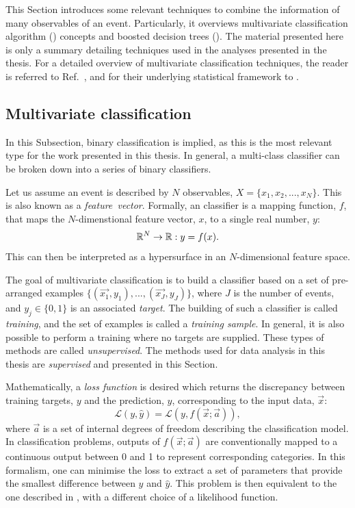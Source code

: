 This Section introduces some relevant techniques to combine the information of many observables of an event. 
Particularly, it overviews multivariate classification algorithm (\MVA) concepts and boosted decision trees (). 
The material presented here is only a summary detailing techniques used in the analyses presented in the thesis.
For a detailed overview of multivariate classification techniques, the reader is referred to Ref.~\cite{Behnke:2013pga}, and for their underlying statistical framework to \cite{Hastie_Tibshirani_Friedman_2001,bishop_2016}.

\subsection{Multivariate classification}

In this Subsection, binary classification is implied, as this is the most relevant type for the work presented in this thesis. 
In general, a multi-class \MVA classifier can be broken down into a series of binary \MVA classifiers.

Let us assume an event is described by $N$ observables, $X=\{x_1,x_2,...,x_N\}$. This is also known as a \textit{feature~vector}.
Formally, an \MVA classifier is a mapping function, $f$, that maps the $N$-dimenstional feature vector, $x$, to a single real number, $y$:
\begin{equation}
    \mathbb{R}^N \rightarrow \mathbb{R}: y = f(x).
\end{equation}
This can then be interpreted as a hypersurface in an $N$-dimensional feature space.

The goal of multivariate classification is to build a classifier based on a set of pre-arranged examples $\{(\vec{x_1},y_1),..., (\vec{x_J},y_J)\}$, where $J$ is the number of events, and $y_j\in\{0,1\}$ is an associated \textit{target}.
The building of such a classifier is called \textit{training}, and the set of examples is called a \textit{training sample}.
In general, it is also possible to perform a training where no targets are supplied. 
These types of methods are called \textit{unsupervised}.
The methods used for data analysis in this thesis are \textit{supervised} and presented in this Section.

Mathematically, a \textit{loss function} is desired which returns the discrepancy between training targets, $y$ and the prediction, $\hat{y}$, corresponding to the input data, $\vec{x}$:
\begin{equation}\label{eq:loss_function}
    \mathcal{L}(y, \hat{y}) = \mathcal{L}(y, f(\vec{x};\vec{a})),
\end{equation}
where $\vec{a}$ is a set of internal degrees of freedom describing the classification model.
In classification problems, outputs of $f(\vec{x};\vec{a})$ are conventionally mapped to a continuous output between 0 and 1 to represent corresponding categories.
In this formalism, one can minimise the loss to extract a set of parameters that provide the smallest difference between $y$ and $\hat{y}$.
This problem is then equivalent to the one described in , with a different choice of a likelihood function.


